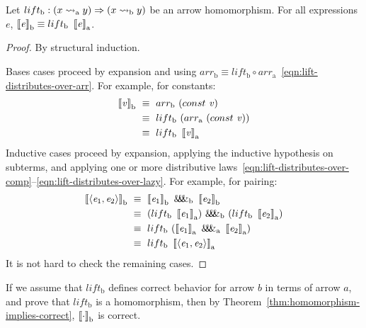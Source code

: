 \documentclass[preprint]{sigplanconf}
\newcommand{\arrow}{\rightsquigarrow}
\newcommand{\arrowlift}{\ensuremath{lift}}
\newcommand{\arrowarr}{\ensuremath{arr}}
\newcommand{\arrowpair}{\ensuremath{\mathit{\&\mspace{-7.5mu}\&\mspace{-7.5mu}\&}}}
\newcommand{\gen}{_\mathrm{a}}
\newcommand{\genb}{_\mathrm{b}}
\begin{document}
\begin{theorem}
Let $\arrowlift\genb : (x \arrow\gen y) \tto (x \arrow\genb y)$ be an arrow homomorphism.
For all expressions $\mathit{e}$, $\meaningof{\mathit{e}}\genb \equiv \arrowlift\genb~\meaningof{\mathit{e}}\gen$.
\label{thm:homomorphism-implies-correct}
\end{theorem}
\begin{proof}
By structural induction.

Bases cases proceed by expansion and using $\arrowarr\genb \equiv \arrowlift\genb \circ \arrowarr\gen$~\eqref{eqn:lift-distributes-over-arr}. For example, for constants:
\begin{align*}
	\meaningof{\mathit{v}}\genb
		&\ \equiv\ \arrowarr\genb~(const~\mathit{v}) \\
		&\ \equiv\ \arrowlift\genb~(\arrowarr\gen~(const~\mathit{v})) \\
		&\ \equiv\ \arrowlift\genb~\meaningof{\mathit{v}}\gen
\end{align*}
Inductive cases proceed by expansion, applying the inductive hypothesis on subterms, and applying one or more distributive laws~\eqref{eqn:lift-distributes-over-comp}--\eqref{eqn:lift-distributes-over-lazy}.
For example, for pairing:
\begin{align*}
	\meaningof{\pair{\mathit{e}_1,\mathit{e}_2}}\genb
		&\ \equiv\ \meaningof{\mathit{e}_1}\genb~\arrowpair\genb~\meaningof{\mathit{e}_2}\genb \\
		&\ \equiv\ (\arrowlift\genb~\meaningof{\mathit{e}_1}\gen)~\arrowpair\genb~(\arrowlift\genb~\meaningof{\mathit{e}_2}\gen) \\
		&\ \equiv\ \arrowlift\genb~(\meaningof{\mathit{e}_1}\gen~\arrowpair\gen~\meaningof{\mathit{e}_2}\gen) \\
		&\ \equiv\ \arrowlift\genb~\meaningof{\pair{\mathit{e}_1,\mathit{e}_2}}\gen
\end{align*}
It is not hard to check the remaining cases.
\end{proof}

If we assume that $\arrowlift\genb$ defines correct behavior for arrow $b$ in terms of arrow $a$, and prove that $\arrowlift\genb$ is a homomorphism, then by Theorem~\ref{thm:homomorphism-implies-correct}, $\meaningof{\cdot}\genb$ is correct.

\end{document}
